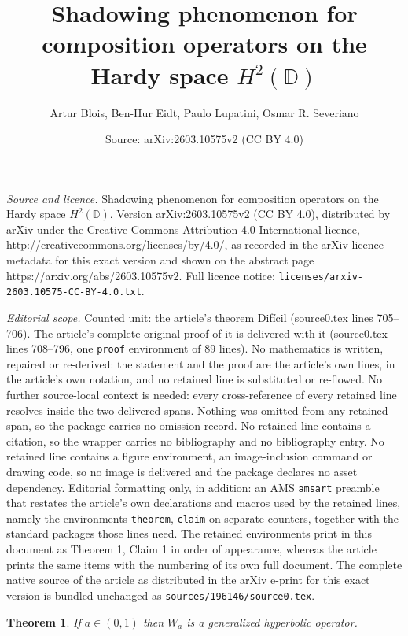 \documentclass[10pt,a4paper]{amsart}
\title{Shadowing phenomenon for composition operators on the Hardy space $H^2(\mathbb{D})$}
\author{Artur Blois, Ben-Hur Eidt, Paulo Lupatini, Osmar R. Severiano}
\date{Source: arXiv:2603.10575v2 (CC BY 4.0)}
\newtheorem{theorem}{Theorem}
\begin{document}
\maketitle

\noindent\emph{Source and licence.} Shadowing phenomenon for composition operators on the Hardy space $H^2(\mathbb{D})$. Version arXiv:2603.10575v2 (CC BY 4.0), distributed by arXiv under the Creative Commons Attribution 4.0 International licence, http://creativecommons.org/licenses/by/4.0/, as recorded in the arXiv licence metadata for this exact version and shown on the abstract page https://arxiv.org/abs/2603.10575v2. Full licence notice: \texttt{licenses/arxiv-2603.10575-CC-BY-4.0.txt}.\par\smallskip

\noindent\textit{Editorial scope.} Counted unit: the article's theorem Difícil (source0.tex lines 705--706). The article's complete original proof of it is delivered with it (source0.tex lines 708--796, one \texttt{proof} environment of 89 lines). No mathematics is written, repaired or re-derived: the statement and the proof are the article's own lines, in the article's own notation, and no retained line is substituted or re-flowed.  No further source-local context is needed: every cross-reference of every retained line resolves inside the two delivered spans.  Nothing was omitted from any retained span, so the package carries no omission record.  No retained line contains a citation, so the wrapper carries no bibliography and no bibliography entry.  No retained line contains a figure environment, an image-inclusion command or drawing code, so no image is delivered and the package declares no asset dependency.  Editorial formatting only, in addition: an AMS \texttt{amsart} preamble that restates the article's own declarations and macros used by the retained lines, namely the environments \texttt{theorem}, \texttt{claim} on separate counters, together with the standard packages those lines need.  The retained environments print in this document as Theorem 1, Claim 1 in order of appearance, whereas the article prints the same items with the numbering of its own full document.  The complete native source of the article as distributed in the arXiv e-print for this exact version is bundled unchanged as \texttt{sources/196146/source0.tex}.
\begin{theorem}\label{Teo Difícil} If $a\in (0,1)$ then $W_a$ is a generalized hyperbolic operator.
\end{theorem}
\end{document}
